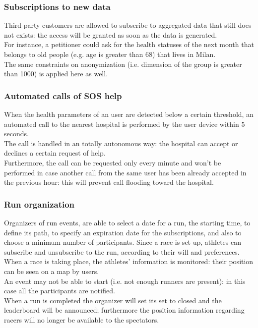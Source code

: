 \subsubsection{Subscriptions to new data}
Third party customers are allowed to subscribe to aggregated data that still does not exists: the access will be granted as soon as the data is generated.\\
For instance, a petitioner could ask for the health statuses of the next month that belongs to old people (e.g. age is greater than 68) that lives in Milan. \\
The same constraints on anonymization (i.e. dimension of the group is greater than 1000) is applied here as well.

\subsubsection{Automated calls of SOS help}
When the health parameters of an user are detected below a certain threshold, an automated call to the nearest hospital is performed by the user device within 5 seconds. \\
The call is handled in an totally autonomous way: the hospital can accept or declines a certain request of help. \\  
Furthermore, the call can be requested only every minute and won't be performed in case another call from the same user has been already accepted in the previous hour: this will prevent call flooding toward the hospital. 

\subsubsection{Run organization}
Organizers of run events, are able to select a date for a run, the starting time, to define its path, to specify an expiration date for the subscriptions, and also to choose a minimum number of participants.
Since a race is set up, athletes can subscribe and unsubscribe to the run, according to their will and preferences. \\
When a race is taking place, the athletes' information is monitored: their position can be seen on a map by users.\\
An event may not be able to start (i.e. not enough runners are present): in this case all the participants are notified. \\
When a run is completed the organizer will set its set to closed and the leaderboard will be announced; furthermore the position information regarding racers will no longer be available to the spectators.  